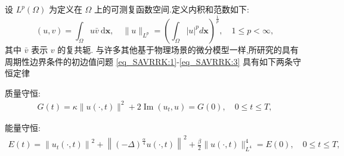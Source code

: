 设 $L^{p}(\Omega)$ 为定义在 $\Omega$ 上的可测复函数空间.定义内积和范数如下:
\begin{equation}
(u, v)=\int_{\Omega} u \bar{v} \mathrm{~d} \boldsymbol{x}, \quad \|u\|_{L^{p}}=\left(\int_{\Omega}|u|^{p} d \boldsymbol{x}\right)^{\frac{1}{p}}, \quad 1 \leq p<\infty,
\label{eq_6}
\end{equation}
其中 $\bar{v}$ 表示 $v$ 的复共轭.
与许多其他基于物理场景的微分模型一样,所研究的具有周期性边界条件的初边值问题 \eqref{eq_SAVRRK:1}-\eqref{eq_SAVRRK:3}  具有如下两条守恒定律\cite{baoUniformErrorEstimates2012,ranLinearlyImplicitConservative2016}

质量守恒:
\begin{align}\label{eq_PAVF:_8}
    G(t)=\kappa\|u(\cdot, t)\|^{2}+2\operatorname{Im}\left(u_{t}, u\right)=G(0), \quad 0 \leq t \leq T,
    \end{align}

	能量守恒:
\begin{align}\label{eq_SAVRRK:9}
	E(t)=\left\|u_{t}(\cdot, t)\right\|^{2}+\left\|(-\Delta)^{\frac{\alpha}{4}} u(\cdot, t)\right\|^{2}+\frac{\beta}{2}\|u(\cdot, t)\|_{L^{4}}^{4}=E(0), \quad 0 \leq t \leq T,
	\end{align}

